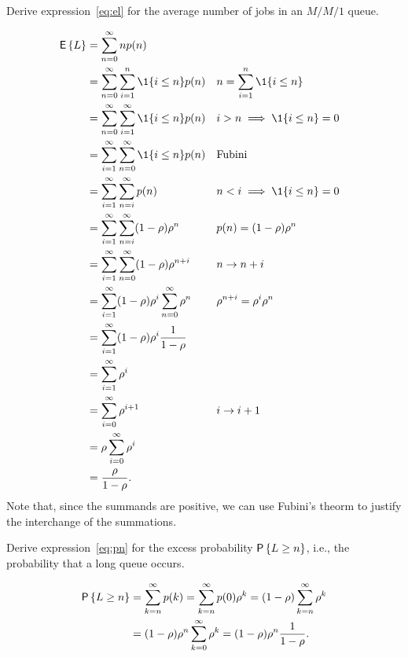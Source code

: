 \begin{question}
  Derive expression~\ref{eq:el} for the average number of jobs in an
  $M/M/1$ queue.  
  \begin{solution}
\begin{align*}
\E L &= \sum_{n=0}^\infty n p(n) \\
&= \sum_{n=0}^\infty \sum_{i=1}^n \1{i\leq n} p(n)  && n=\sum_{i=1}^n \1{i\leq n}\\
&= \sum_{n=0}^\infty \sum_{i=1}^\infty   \1{i\leq n} p(n)  && i>n\implies \1{i\leq n} = 0\\
&= \sum_{i=1}^\infty \sum_{n=0}^\infty  \1{i\leq n} p(n) &&\text{Fubini} \\
&= \sum_{i=1}^\infty \sum_{n=i}^\infty p(n) && n < i \implies \1{i\leq n}=0 \\
&= \sum_{i=1}^\infty \sum_{n=i}^\infty (1-\rho)\rho^n && p(n) = (1-\rho)\rho^n \\
&= \sum_{i=1}^\infty \sum_{n=0}^\infty (1-\rho)\rho^{n+i} && n\to n+i \\
&= \sum_{i=1}^\infty (1-\rho)\rho^i \sum_{n=0}^\infty \rho^n && \rho^{n+i}=\rho^i \rho^n\\
&= \sum_{i=1}^\infty (1-\rho)\rho^i \frac1{1-\rho}   \\
&= \sum_{i=1}^\infty \rho^i \\
&= \sum_{i=0}^\infty \rho^{i+1} && i\to i+1\\
&= \rho \sum_{i=0}^\infty \rho^i \\
&= \frac{\rho}{1-\rho}.
\end{align*}
Note that, since the summands are positive, we can use Fubini's theorm
to justify the interchange of the summations.

  \end{solution}
\end{question}

\begin{question}
  Derive expression~\ref{eq:pn} for the excess probability $\P{L\geq n}$, i.e., the probability that a long queue occurs. 
  \begin{hint}
  \end{hint}
  \begin{solution}
    \begin{equation*}
      \begin{split}
 \P{L\geq n} 
 &= \sum_{k=n}^\infty p(k) = \sum_{k=n}^\infty p(0)\rho^k = (1-\rho)\sum_{k=n}^\infty \rho^k \\
 &= (1-\rho)\rho^n \sum_{k=0}^\infty\rho^k = (1-\rho) \rho^n \frac1{1-\rho}.
\end{split}
\end{equation*}
\end{solution}
\end{question}


